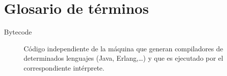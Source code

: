 \chapter{Glosario de términos}
\label{chap:glosario-terminos}


\begin{description}
 \item [Bytecode] Código independiente de la máquina que generan
   compiladores de determinados lenguajes (Java, Erlang,\ldots{}) y que es
   ejecutado por el correspondiente intérprete.
\end{description}
